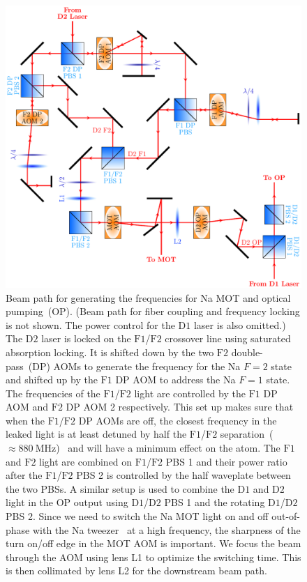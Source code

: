 \begin{figure}
  \centering
  \includegraphics[width=\textwidth]{figures/loading_na_res_beampath.pdf}
  \caption[Beam path for Na $\mathrm{D1}$ and $\mathrm{D2}$ light]{
    Beam path for generating the frequencies for Na MOT and optical pumping~(OP).
    (Beam path for fiber coupling and frequency locking is not shown.
    The power control for the $\mathrm{D1}$ laser is also omitted.)
    The $\mathrm{D2}$ laser is locked on the $\mathrm{F1}$/$\mathrm{F2}$ crossover line using
    saturated absorption locking.
    It is shifted down by the two $\mathrm{F2}$ double-pass~(DP) AOMs to generate the frequency
    for the Na $F=2$ state and shifted up by the $\mathrm{F1}$ DP AOM
    to address the Na $F=1$ state.
    The frequencies of the $\mathrm{F1}$/$\mathrm{F2}$ light are controlled
    by the $\mathrm{F1}$ DP AOM and $\mathrm{F2}$ DP AOM 2 respectively.
    This set up makes sure that when the $\mathrm{F1}$/$\mathrm{F2}$ DP AOMs are off,
    the closest frequency in the leaked light is at least detuned
    by half the $\mathrm{F1}$/$\mathrm{F2}$
    separation~($\approx\!880~\mathrm{MHz}$)~\cite{steck_sodium_2019}
    and will have a minimum effect on the atom.
    The $\mathrm{F1}$ and $\mathrm{F2}$ light are combined
    on $\mathrm{F1}$/$\mathrm{F2}$ PBS 1 and their power ratio after the
    $\mathrm{F1}$/$\mathrm{F2}$ PBS 2 is controlled by the half waveplate between the two PBSs.
    A similar setup is used to combine the $\mathrm{D1}$ and $\mathrm{D2}$ light
    in the OP output using $\mathrm{D1}$/$\mathrm{D2}$ PBS 1
    and the rotating $\mathrm{D1}$/$\mathrm{D2}$ PBS 2.
    Since we need to switch the Na MOT light on and off out-of-phase
    with the Na tweezer~\cite{hutzler_eliminating_2017} at a high frequency,
    the sharpness of the turn on/off edge in the MOT AOM is important.
    We focus the beam through the AOM using lens L1 to optimize the switching time.
    This is then collimated by lens L2 for the downstream beam path.
    \label{fig:loading:free-space:na-res-beampath}}
\end{figure}

